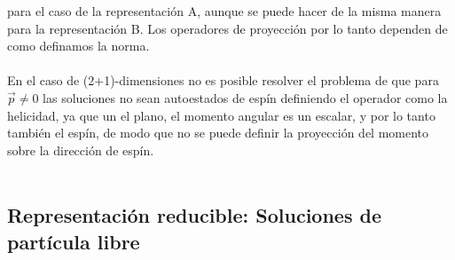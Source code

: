 \documentclass[11pt,letterpaper]{article}     %
\begin{document}
para el caso de la representación A, aunque se puede hacer de la misma manera para la representación B. Los operadores de proyección por lo tanto dependen de como definamos la norma. \\ \\ 
En el caso de (2+1)-dimensiones no es posible resolver el problema de que para $\vec{p} \neq 0$ las soluciones no sean autoestados de espín definiendo el operador  como la helicidad, ya que un el plano, el momento angular es un escalar, y por lo tanto también el espín, de modo que no se puede definir la proyección del momento sobre la dirección de espín. \\ \\





\subsection{Representación reducible: Soluciones de partícula libre}
\end{document}
